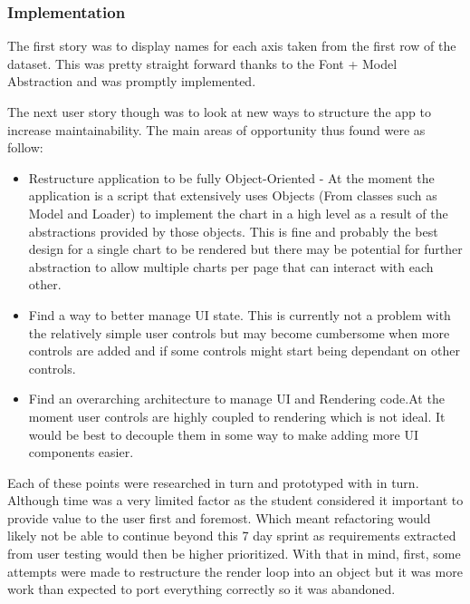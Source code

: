 \subsubsection{Implementation}
The first story was to display names for each axis taken from the first row of the dataset. This was pretty straight forward thanks to the Font + Model Abstraction and was promptly implemented.

The next user story though was to look at new ways to structure the app to increase maintainability. The main areas of opportunity thus found were as follow:
\begin{itemize}
    \item Restructure application to be fully Object-Oriented - At the moment the application is a script that extensively uses Objects (From classes such as Model and Loader) to implement the chart in a high level as a result of the abstractions provided by those objects. This is fine and probably the best design for a single chart to be rendered but there may be potential for further abstraction to allow multiple charts per page that can interact with each other.
    \item Find a way to better manage UI state. This is currently not a problem with the relatively simple user controls but may become cumbersome when more controls are added and if some controls might start being dependant on other controls.
    \item Find an overarching architecture to manage UI and Rendering code.At the moment user controls are highly coupled to rendering which is not ideal. It would be best to decouple them in some way to make adding more UI components easier.
\end{itemize}

Each of these points were researched in turn and prototyped with in turn. Although time was a very limited factor as the student considered it important to provide value to the user first and foremost. Which meant refactoring would likely not be able to continue beyond this 7 day sprint as requirements extracted from user testing would then be higher prioritized. With that in mind, first, some attempts were made to restructure the render loop into an object but it was more work than expected to port everything correctly so it was abandoned.

